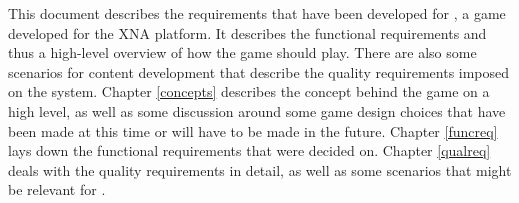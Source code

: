 This document describes the requirements that have been developed for \project,
a game developed for the XNA platform. It describes the functional requirements
and thus a high-level overview of how the game should play. There are also some
scenarios for content development that describe the quality requirements imposed
on the system. Chapter \ref{concepts} describes the concept behind the game on
a high level, as well as some discussion around some game design choices that
have been made at this time or will have to be made in the future. Chapter
\ref{funcreq} lays down the functional requirements that were decided on.
Chapter \ref{qualreq} deals with the quality requirements in detail, as well as
some scenarios that might be relevant for \project.
